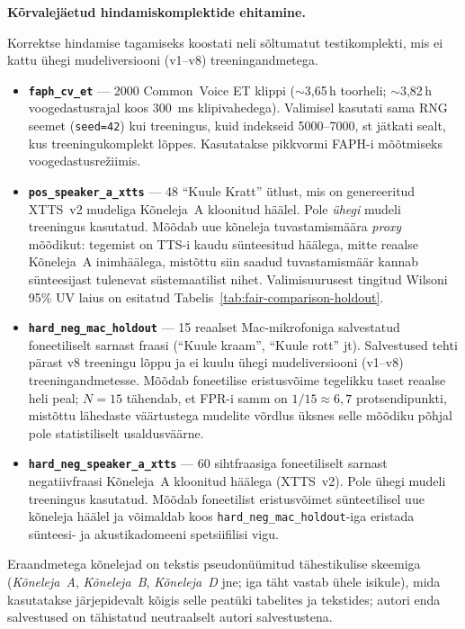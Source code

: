 \medskip
\noindent\textbf{Kõrvalejäetud hindamiskomplektide ehitamine.}

Korrektse hindamise tagamiseks koostati neli sõltumatut testikomplekti, mis ei kattu ühegi mudeliversiooni (v1--v8) treeningandmetega.

\begin{itemize}
    \item \textbf{\texttt{faph\_cv\_et}} --- 2000 Common~Voice ET klippi ($\sim$3,65\,h toorheli; $\sim$3,82\,h voogedastusrajal koos 300~ms klipivahedega). Valimisel kasutati sama RNG seemet (\texttt{seed=42}) kui treeningus, kuid indekseid 5000--7000, st jätkati sealt, kus treeningukomplekt lõppes. Kasutatakse pikkvormi FAPH-i mõõtmiseks voogedastusrežiimis.
    \item \textbf{\texttt{pos\_speaker\_a\_xtts}} --- 48 \enquote{Kuule Kratt} ütlust, mis on genereeritud XTTS~v2 mudeliga Kõneleja~A kloonitud häälel. Pole \emph{ühegi} mudeli treeningus kasutatud. Mõõdab uue kõneleja tuvastamismäära \emph{proxy} mõõdikut: tegemist on TTS-i kaudu sünteesitud häälega, mitte reaalse Kõneleja~A inimhäälega, mistõttu siin saadud tuvastamismäär kannab sünteesijast tulenevat süstemaatilist nihet. Valimisuurusest tingitud Wilsoni 95\% UV laius on esitatud Tabelis~\ref{tab:fair-comparison-holdout}.
    \item \textbf{\texttt{hard\_neg\_mac\_holdout}} --- 15 reaalset Mac-mikrofoniga salvestatud foneetiliselt sarnast fraasi (\enquote{Kuule kraam}, \enquote{Kuule rott} jt). Salvestused tehti pärast v8 treeningu lõppu ja ei kuulu ühegi mudeliversiooni (v1--v8) treeningandmetesse. Mõõdab foneetilise eristusvõime tegelikku taset reaalse heli peal; $N=15$ tähendab, et FPR-i samm on $1/15 \approx 6{,}7$ protsendipunkti, mistõttu lähedaste väärtustega mudelite võrdlus üksnes selle mõõdiku põhjal pole statistiliselt usaldusväärne.
    \item \textbf{\texttt{hard\_neg\_speaker\_a\_xtts}} --- 60 sihtfraasiga foneetiliselt sarnast negatiivfraasi Kõneleja~A kloonitud häälega (XTTS~v2). Pole ühegi mudeli treeningus kasutatud. Mõõdab foneetilist eristusvõimet sünteetilisel uue kõneleja häälel ja võimaldab koos \texttt{hard\_neg\_mac\_holdout}-iga eristada sünteesi- ja akustikadomeeni spetsiifilisi vigu.
\end{itemize}

Eraandmetega kõnelejad on tekstis pseudonüümitud tähestikulise skeemiga (\emph{Kõneleja~A}, \emph{Kõneleja~B}, \emph{Kõneleja~D} jne; iga täht vastab ühele isikule), mida kasutatakse järjepidevalt kõigis selle peatüki tabelites ja tekstides; autori enda salvestused on tähistatud neutraalselt autori salvestustena.\label{para:speaker-pseudonyms}

